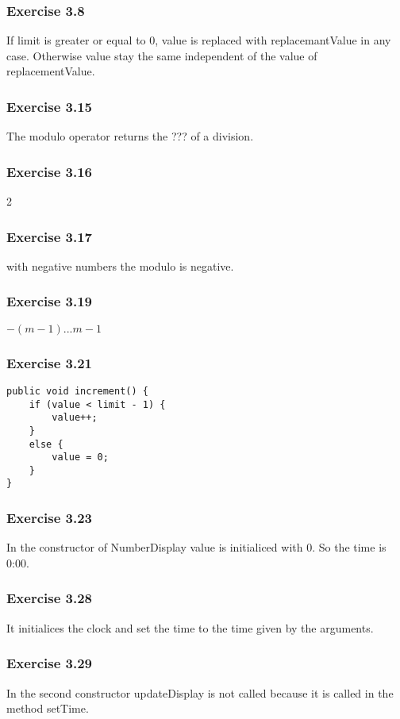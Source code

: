 \subsubsection*{Exercise 3.8}
If limit is greater or equal to 0, value is replaced with replacemantValue in 
any case. Otherwise value stay the same independent of the value of 
replacementValue. 

\subsubsection*{Exercise 3.15}
The modulo operator returns the ??? of a division. 

\subsubsection*{Exercise 3.16}
2

\subsubsection*{Exercise 3.17}
with negative numbers the modulo is negative. 

\subsubsection*{Exercise 3.19}
$-(m-1) ... m-1$

\subsubsection*{Exercise 3.21}
\begin{lstlisting}
public void increment() {
    if (value < limit - 1) {
        value++;
    }
    else {
        value = 0;
    }
}
\end{lstlisting}

\subsubsection*{Exercise 3.23}
In the constructor of NumberDisplay value is initialiced with 0. So the time is 
0:00. 

\subsubsection*{Exercise 3.28}
It initialices the clock and set the time to the time given by the arguments. 

\subsubsection*{Exercise 3.29}
In the second constructor updateDisplay is not called because it is called in 
the method setTime. 

